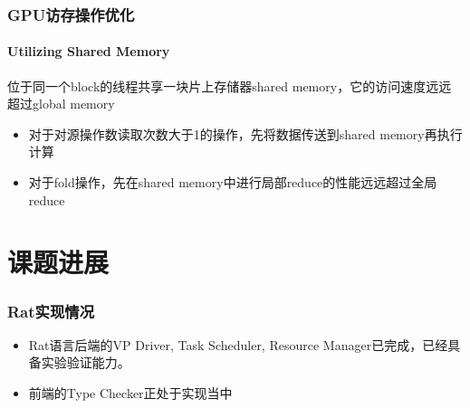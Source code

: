 \documentclass{beamer}
\begin{document}
\begin{frame}
  \frametitle{GPU访存操作优化}
  \framesubtitle{Utilizing Shared Memory}
  位于同一个block的线程共享一块片上存储器shared memory，它的访问速度远远超过global memory
  \begin{itemize}
    \item 对于对源操作数读取次数大于1的操作，先将数据传送到shared memory再执行计算
    \item 对于fold操作，先在shared memory中进行局部reduce的性能远远超过全局reduce
  \end{itemize}
\end{frame}

\section{课题进展}
\frame{\tableofcontents[currentsection]}

\begin{frame}
  \frametitle{Rat实现情况}
  \begin{itemize}
    \item<1-> Rat语言后端的VP Driver, Task Scheduler, Resource Manager已完成，已经具备实验验证能力。
    \item<2-> 前端的Type Checker正处于实现当中
  \end{itemize}
\end{frame}
\end{document}
